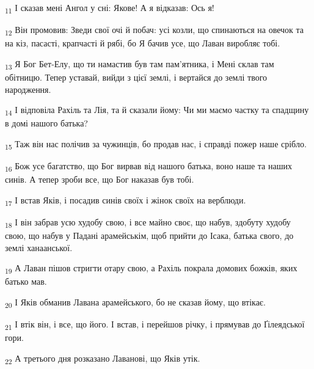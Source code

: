 \begin{tcolorbox}
\textsubscript{11} І сказав мені Ангол у сні: Якове! А я відказав: Ось я!
\end{tcolorbox}
\begin{tcolorbox}
\textsubscript{12} Він промовив: Зведи свої очі й побач: усі козли, що спинаються на овечок та на кіз, пасасті, крапчасті й рябі, бо Я бачив усе, що Лаван виробляє тобі.
\end{tcolorbox}
\begin{tcolorbox}
\textsubscript{13} Я Бог Бет-Елу, що ти намастив був там пам'ятника, і Мені склав там обітницю. Тепер уставай, вийди з цієї землі, і вертайся до землі твого народження.
\end{tcolorbox}
\begin{tcolorbox}
\textsubscript{14} І відповіла Рахіль та Лія, та й сказали йому: Чи ми маємо частку та спадщину в домі нашого батька?
\end{tcolorbox}
\begin{tcolorbox}
\textsubscript{15} Таж він нас полічив за чужинців, бо продав нас, і справді пожер наше срібло.
\end{tcolorbox}
\begin{tcolorbox}
\textsubscript{16} Бож усе багатство, що Бог вирвав від нашого батька, воно наше та наших синів. А тепер зроби все, що Бог наказав був тобі.
\end{tcolorbox}
\begin{tcolorbox}
\textsubscript{17} І встав Яків, і посадив синів своїх і жінок своїх на верблюди.
\end{tcolorbox}
\begin{tcolorbox}
\textsubscript{18} І він забрав усю худобу свою, і все майно своє, що набув, здобуту худобу свою, що набув у Падані арамейськім, щоб прийти до Ісака, батька свого, до землі ханаанської.
\end{tcolorbox}
\begin{tcolorbox}
\textsubscript{19} А Лаван пішов стригти отару свою, а Рахіль покрала домових божків, яких батько мав.
\end{tcolorbox}
\begin{tcolorbox}
\textsubscript{20} І Яків обманив Лавана арамейського, бо не сказав йому, що втікає.
\end{tcolorbox}
\begin{tcolorbox}
\textsubscript{21} І втік він, і все, що його. І встав, і перейшов річку, і прямував до Ґілеядської гори.
\end{tcolorbox}
\begin{tcolorbox}
\textsubscript{22} А третього дня розказано Лаванові, що Яків утік.
\end{tcolorbox}
